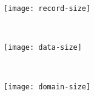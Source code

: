 \begin{figure}[!ht]
	\centering
	\begin{minipage}{0.31\columnwidth}
		\centering
		\texttt{[image: record-size]}
		\label{figure:record-size}
	\end{minipage}
	~ %
	\begin{minipage}{0.31\columnwidth}
		\centering
		\texttt{[image: data-size]}
		\label{figure:data-size}
	\end{minipage}
	~ %
	\begin{minipage}{0.31\columnwidth}
		\centering
		\texttt{[image: domain-size]}
		\label{figure:domain-size}
	\end{minipage}
\end{figure}
